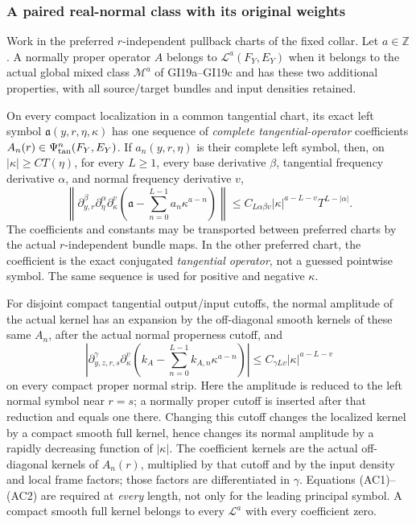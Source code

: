 \documentclass[
  11pt,
]{article}
\makeatletter
\let\ReaderOriginalAnchorStart\hyper@anchorstart
\let\ReaderOriginalAnchorEnd\hyper@anchorend
\let\ReaderPendingAliases\@empty
\def\ReaderArmAliases#1{\gdef\ReaderPendingAliases{#1}}
\def\hyper@anchorstart#1{\ReaderIfNativeAnchorTF{#1}{\ReaderPendingAliases\global\let\ReaderPendingAliases\@empty}{}\ReaderOriginalAnchorStart{#1}}
\makeatother
\begin{document}
\ReaderArmAliases{\ReaderOriginalAnchorStart{AN03-GCF-FOUNDATION-029}\ReaderOriginalAnchorEnd\begingroup\expandafter\def\csname @currentHref\endcsname{AN03-GCF-FOUNDATION-029}\label{AN03-GCF-FOUNDATION-029}\endgroup\ReaderOriginalAnchorStart{paired-normal-definition}\ReaderOriginalAnchorEnd}
\subsubsection{A paired real-normal class with its original
weights}\label{paired-normal-definition}

Work in the preferred \(r\)-independent pullback charts of the fixed
collar. Let \(a\in\mathbb Z\). A normally proper operator \(A\) belongs
to \(\mathcal L^a(F_Y,E_Y)\) when it belongs to the actual global mixed
class \(\mathscr M^a\) of GI19a--GI19c and has these two additional
properties, with all source/target bundles and input densities retained.

On every compact localization in a common tangential chart, its exact
left symbol \(\mathfrak a(y,r,\eta,\kappa)\) has one sequence of
\emph{complete tangential-operator} coefficients
\(A_n(r)\in\Psi_{\rm tan}^n(F_Y,E_Y)\). If \(a_n(y,r,\eta)\) is their
complete left symbol, then, on \(|\kappa|\geq C T(\eta)\), for every
\(L\geq1\), every base derivative \(\beta\), tangential frequency
derivative \(\alpha\), and normal frequency derivative \(v\), \[
 \left\|\partial_{y,r}^{\beta}\partial_\eta^\alpha\partial_\kappa^v
 \left(\mathfrak a-\sum_{n=0}^{L-1}a_n\kappa^{a-n}\right)\right\|
 \leq C_{L\alpha\beta v}|\kappa|^{a-L-v}T^{L-|\alpha|}.
 \tag{AC1}
\] The coefficients and constants may be transported between preferred
charts by the actual \(r\)-independent bundle maps. In the other
preferred chart, the coefficient is the exact conjugated
\emph{tangential operator}, not a guessed pointwise symbol. The same
sequence is used for positive and negative \(\kappa\).

For disjoint compact tangential output/input cutoffs, the normal
amplitude of the actual kernel has an expansion by the off-diagonal
smooth kernels of these same \(A_n\), after the actual normal properness
cutoff, and \[
 \left|\partial_{y,z,r,s}^{\gamma}\partial_\kappa^v
 \left(k_A-\sum_{n=0}^{L-1}k_{A,n}\kappa^{a-n}\right)\right|
 \leq C_{\gamma Lv}|\kappa|^{a-L-v}
 \tag{AC2}
\] on every compact proper normal strip. Here the amplitude is reduced
to the left normal symbol near \(r=s\); a normally proper cutoff is
inserted after that reduction and equals one there. Changing this cutoff
changes the localized kernel by a compact smooth full kernel, hence
changes its normal amplitude by a rapidly decreasing function of
\(|\kappa|\). The coefficient kernels are the actual off-diagonal
kernels of \(A_n(r)\), multiplied by that cutoff and by the input
density and local frame factors; those factors are differentiated in
\(\gamma\). Equations (AC1)--(AC2) are required at \emph{every} length,
not only for the leading principal symbol. A compact smooth full kernel
belongs to every \(\mathcal L^a\) with every coefficient zero.
\end{document}
